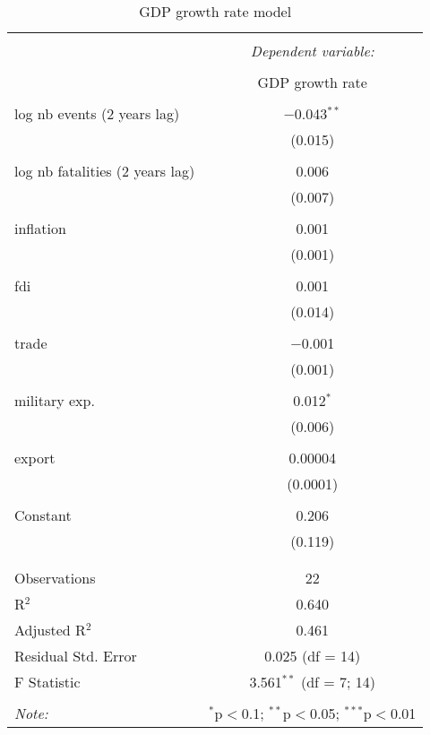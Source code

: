 
\begin{table}[!htbp] \centering 
  \caption{GDP growth rate model} 
  \label{} 
\begin{tabular}{@{\extracolsep{5pt}}lc} 
\\[-1.8ex]\hline 
\hline \\[-1.8ex] 
 & \multicolumn{1}{c}{\textit{Dependent variable:}} \\ 
\cline{2-2} 
\\[-1.8ex] & GDP growth rate \\ 
\hline \\[-1.8ex] 
 log nb events (2 years lag) & $-$0.043$^{**}$ \\ 
  & (0.015) \\ 
  & \\ 
 log nb fatalities (2 years lag) & 0.006 \\ 
  & (0.007) \\ 
  & \\ 
 inflation & 0.001 \\ 
  & (0.001) \\ 
  & \\ 
 fdi & 0.001 \\ 
  & (0.014) \\ 
  & \\ 
 trade & $-$0.001 \\ 
  & (0.001) \\ 
  & \\ 
 military exp. & 0.012$^{*}$ \\ 
  & (0.006) \\ 
  & \\ 
 export & 0.00004 \\ 
  & (0.0001) \\ 
  & \\ 
 Constant & 0.206 \\ 
  & (0.119) \\ 
  & \\ 
\hline \\[-1.8ex] 
Observations & 22 \\ 
R$^{2}$ & 0.640 \\ 
Adjusted R$^{2}$ & 0.461 \\ 
Residual Std. Error & 0.025 (df = 14) \\ 
F Statistic & 3.561$^{**}$ (df = 7; 14) \\ 
\hline 
\hline \\[-1.8ex] 
\textit{Note:}  & \multicolumn{1}{r}{$^{*}$p$<$0.1; $^{**}$p$<$0.05; $^{***}$p$<$0.01} \\ 
\end{tabular} 
\end{table} 
